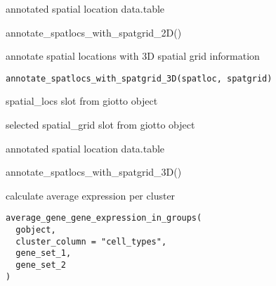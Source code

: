 \documentclass[a4paper]{book}
\begin{document}
%
\begin{Value}
annotated spatial location data.table
\end{Value}
%
\begin{Examples}
\begin{ExampleCode}
    annotate_spatlocs_with_spatgrid_2D()
\end{ExampleCode}
\end{Examples}
%
\begin{Description}\relax
annotate spatial locations with 3D spatial grid information
\end{Description}
%
\begin{Usage}
\begin{verbatim}
annotate_spatlocs_with_spatgrid_3D(spatloc, spatgrid)
\end{verbatim}
\end{Usage}
%
\begin{Arguments}
\begin{ldescription}
\item[\code{spatloc}] spatial\_locs slot from giotto object

\item[\code{spatgrid}] selected spatial\_grid slot from giotto object
\end{ldescription}
\end{Arguments}
%
\begin{Value}
annotated spatial location data.table
\end{Value}
%
\begin{Examples}
\begin{ExampleCode}
    annotate_spatlocs_with_spatgrid_3D()
\end{ExampleCode}
\end{Examples}
%
\begin{Description}\relax
calculate average expression per cluster
\end{Description}
%
\begin{Usage}
\begin{verbatim}
average_gene_gene_expression_in_groups(
  gobject,
  cluster_column = "cell_types",
  gene_set_1,
  gene_set_2
)
\end{verbatim}
\end{Usage}
\end{document}
